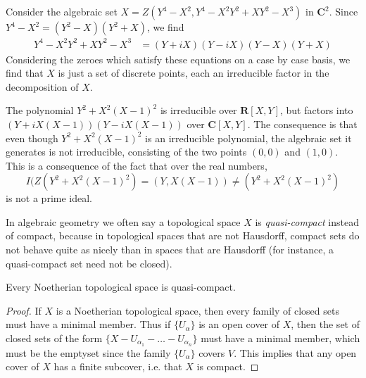 \begin{example}
    Consider the algebraic set $X = Z(Y^4 - X^2, Y^4 - X^2Y^2 + XY^2 - X^3)$ in $\mathbf{C}^2$. Since $Y^4 - X^2 = (Y^2 - X)(Y^2 + X)$, we find
    \begin{align*}
        Y^4 - X^2Y^2 + XY^2 - X^3 &= (Y + iX)(Y - iX)(Y-X)(Y+X)
    \end{align*}
    Considering the zeroes which satisfy these equations on a case by case basis, we find that $X$ is just a set of discrete points, each an irreducible factor in the decomposition of $X$.
\end{example}

\begin{example}
    The polynomial $Y^2 + X^2(X-1)^2$ is irreducible over $\mathbf{R}[X,Y]$, but factors into $(Y + iX(X-1))(Y - iX(X-1))$ over $\mathbf{C}[X,Y]$. The consequence is that even though $Y^2 + X^2(X-1)^2$ is an irreducible polynomial, the algebraic set it generates is not irreducible, consisting of the two points $(0,0)$ and $(1,0)$. This is a consequence of the fact that over the real numbers,
    \[ I(Z(Y^2 + X^2(X-1)^2) = (Y,X(X-1)) \neq (Y^2 + X^2(X - 1)^2) \]
    is not a prime ideal.
\end{example}

In algebraic geometry we often say a topological space $X$ is \emph{quasi-compact} instead of compact, because in topological spaces that are not Hausdorff, compact sets do not behave quite as nicely than in spaces that are Hausdorff (for instance, a quasi-compact set need not be closed).

\begin{theorem}
    Every Noetherian topological space is quasi-compact.
\end{theorem}
\begin{proof}
    If $X$ is a Noetherian topological space, then every family of closed sets must have a minimal member. Thus if $\{ U_\alpha \}$ is an open cover of $X$, then the set of closed sets of the form $\{ X - U_{\alpha_1} - \dots - U_{\alpha_n} \}$ must have a minimal member, which must be the emptyset since the family $\{ U_\alpha \}$ covers $V$. This implies that any open cover of $X$ has a finite subcover, i.e. that $X$ is compact. 
\end{proof}


